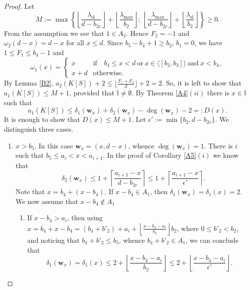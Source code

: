 \documentclass[10pt,a4paper]{amsart}
\def\Iset{{\mathbb I}}
\def\deg{\operatorname{deg}}
\def\wbf{{\mathbf w}}
\begin{document}
\begin{proof} Let
$$M:=  \max\left\{ \left\lfloor \frac{ \lambda_{\mathrm{sl}}}{d-b_{2r}} \right\rfloor + \left\lfloor \frac{\lambda_{\max}}{b_2} \right\rfloor;\ \left\lfloor \frac{ \lambda_{\max}}{d-b_{2r}} \right\rfloor + \left\lfloor \frac{\lambda_{\mathrm{sl}}}{b_2} \right\rfloor \right\}\geq 0.$$
From the assumption we see that $1\in A_2$. Hence $F_2 = -1$ and $\omega_2(d- x) = d- x$ for all $x\leq d$. Since $b_5 - b_4 + 1\geq b_2$, $b_1= 0$,  we have $1 \leq F_1 \leq b_4 -1$ and
$$\omega_1(x) = \begin{cases} x & \text{if}\quad  b_4 \leq x < d \ \text{or} \ x \in \langle [b_2,b_3] \rangle \ \text{and}\ x< b_4,\\
x+ d &\text{otherwise}.
\end{cases}$$
 By Lemma \ref{B2}, $a_2(K[S]) + 2 \leq \lfloor \frac{F_1+ F_2}{d}\rfloor + 2 = 2$. So, it is left to  show that $a_1(K[S]) \leq M + 1 $, provided  that $\Iset\neq \emptyset$. By Theorem \ref{A4}\((ii)\) there is  $x\in \Iset$ such that
 $$a_1(K[S]) \leq \delta_1(\wbf_x ) + \delta_2(\wbf_x) - \deg(\wbf_x) - 2 =: D(x).$$
 It is enough to show that $D(x) \leq M + 1$. Let $\epsilon' := \min\{ b_2 , d-b_{2r}\}$. We distinguish three cases.
 \begin{enumerate}
     \item $ x>b_5$. In this case $\wbf_x = (x, d-x)$, whence $\deg(\wbf_x) = 1$.  There is $i$ such that $b_5\leq a_i < x < a_{i+1}$. In the proof of Corollary \ref{A5}\((i)\) we know that 
 \begin{equation}\label{EBd21}
\delta_2(\wbf_x) \leq 1 + \left\lceil \frac{a_{i+1} - x}{d- b_{2r}} \right\rceil \leq 1+ \left\lceil \frac{a_{i+1} - x}{\epsilon'} \right\rceil.
\end{equation}
  Note that $x = b_4 + (x-b_4)$. If $x-b_4 \in A_1$, then $\delta_1(\wbf_x) = \delta_1(x) = 2$. We now assume that $x-b_4 \not\in A_1$
  \begin{enumerate}[\((\text{a}1)\)]
      \item If $ x-b_4 > a_i$, then using $x= b_4 + x-b_4 = (b_4 + b'_2) + a_i +  \left\lfloor \frac{x-b_4 - a_i}{b_2} \right\rfloor b_2$, where $0\leq b'_2 < b_2$, and noticing that $b_4 + b'_2 \leq b_5$, whence $b_4+b'_2 \in A_1$, we can conclude that 
  \begin{equation}\label{EBd22}
  \delta_1(\wbf_x) = \delta_1(x) \leq 2 + \left\lfloor \frac{x-b_4 - a_i}{b_2} \right\rfloor  \leq 2+ \left\lfloor \frac{x-b_4 - a_i}{\epsilon'} \right\rfloor.
  \end{equation}

\end{enumerate}
\end{enumerate}
\end{proof}
\end{document}
